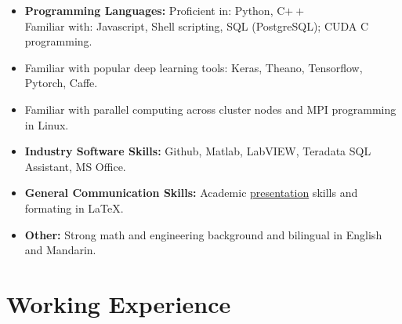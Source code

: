 \documentclass[11pt,a4paper,sans]{moderncv}        %
\begin{document}
	\begin{itemize}
		
		\item \textbf{Programming Languages:} Proficient in: Python, C$++$ \\ Familiar with: Javascript, Shell scripting, SQL (PostgreSQL); CUDA C programming.
		
		\vspace{6pt}
		
		\item{Familiar with popular deep learning tools: Keras, Theano, Tensorflow, Pytorch, Caffe.}
		
		\vspace{6pt}
		
		\item{Familiar with parallel computing across cluster nodes and MPI programming in Linux.}
		
		\vspace{6pt}
		
		\item \textbf{Industry Software Skills:} Github, Matlab, LabVIEW, Teradata SQL Assistant, MS Office.	
		
		\vspace{6pt}
		
		\item \textbf{General Communication Skills:} Academic \href{https://hma02.github.io/AllanMa/presentations.html}{presentation} skills and formating in \LaTeX.
		
		\vspace{6pt}
		
		\item \textbf{Other:} Strong math and engineering background and bilingual in English and Mandarin.
		
	\end{itemize}
	
	\vspace{2pt}
	
	\section{Working Experience}
	
	\vspace{6pt}
	
\end{document}
